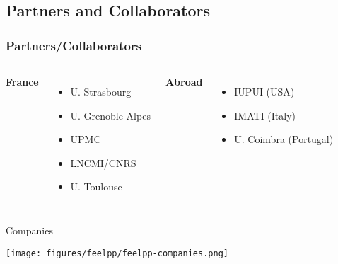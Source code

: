 \subsection{Partners and Collaborators}
\begin{frame}
  \frametitle{Partners/Collaborators}

  \begin{columns}[c]
  \textbf{France}
  \begin{itemize}
  \item U. Strasbourg
  \item U. Grenoble Alpes
  \item UPMC
  \item LNCMI/CNRS
  \item U. Toulouse
  \end{itemize}
  \textbf{Abroad}
  \begin{itemize}
  \item IUPUI (USA)
  \item IMATI (Italy)
  \item U. Coimbra (Portugal)
  \end{itemize}

  \end{columns}
\end{frame}

\begin{frame}{Companies}
  \begin{center}
    \centerline{\texttt{[image: figures/feelpp/feelpp-companies.png]}}
  \end{center}
\end{frame}

